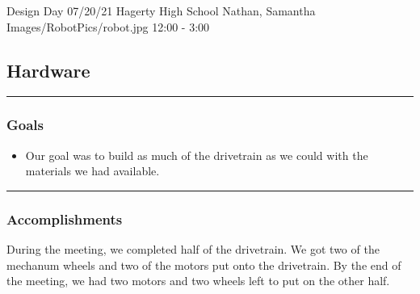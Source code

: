 \insertmeeting 
	{Design Day} 
	{07/20/21}
	{Hagerty High School}
	{Nathan, Samantha}
	{Images/RobotPics/robot.jpg}
	{12:00 - 3:00}
	
\subsection*{Hardware}
\noindent\hfil\rule{\textwidth}{.4pt}\hfil
\subsubsection*{Goals}
\begin{itemize}
    \item Our goal was to build as much of the drivetrain as we could with the materials we had available.  

\end{itemize} 

\noindent\hfil\rule{\textwidth}{.4pt}\hfil

\subsubsection*{Accomplishments}
During the meeting, we completed half of the drivetrain. We got two of the mechanum wheels and two of the motors put onto the drivetrain. By the end of the meeting, we had two motors and two wheels left to put on the other half. 






